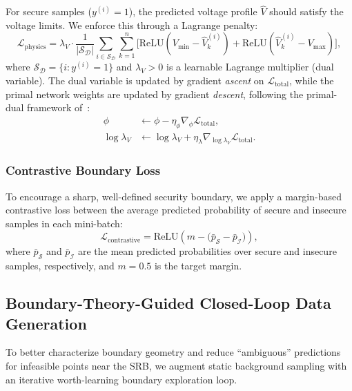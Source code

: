 \documentclass[journal]{IEEEtran}
\newcommand{\SSR}{\mathcal{S}}
\newcommand{\Loss}{\mathcal{L}}
\newcommand{\relu}{\mathrm{ReLU}}
\begin{document}
For secure samples ($y^{(i)}=1$), the predicted voltage profile $\hat{V}$
should satisfy the voltage limits. We enforce this through a Lagrange penalty:
\begin{equation}
  \Loss_{\mathrm{physics}} = \lambda_V \cdot
    \frac{1}{|\SSR_\mathcal{D}|} \sum_{i \in \SSR_\mathcal{D}}
    \sum_{k=1}^{n} \bigl[\relu(V_{\min} - \hat{V}_k^{(i)})
      + \relu(\hat{V}_k^{(i)} - V_{\max})\bigr],
  \label{eq:physics_loss}
\end{equation}
where $\SSR_\mathcal{D} = \{i : y^{(i)} = 1\}$ and $\lambda_V > 0$ is a learnable
Lagrange multiplier (dual variable). The dual variable is updated by gradient
\emph{ascent} on $\Loss_{\mathrm{total}}$, while the primal network weights are
updated by gradient \emph{descent}, following the primal-dual framework
of~\cite{kim2025deeplagrange}:
\begin{align}
  \phi &\leftarrow \phi - \eta_\phi \nabla_\phi \Loss_{\mathrm{total}},
    \label{eq:primal_update}\\
  \log\lambda_V &\leftarrow \log\lambda_V + \eta_\lambda
    \nabla_{\log\lambda_V} \Loss_{\mathrm{total}}.
    \label{eq:dual_update}
\end{align}

\subsubsection{Contrastive Boundary Loss}

To encourage a sharp, well-defined security boundary, we apply a margin-based
contrastive loss between the average predicted probability of secure and
insecure samples in each mini-batch:
\begin{equation}
  \Loss_{\mathrm{contrastive}} = \relu\!\left(
    m - \bigl(\bar{p}_{\SSR} - \bar{p}_{\mathcal{I}}\bigr)
  \right),
  \label{eq:contrastive}
\end{equation}
where $\bar{p}_{\SSR}$ and $\bar{p}_{\mathcal{I}}$ are the mean
predicted probabilities over secure and insecure samples, respectively, and
$m = 0.5$ is the target margin.

\subsection{Boundary-Theory-Guided Closed-Loop Data Generation}
\label{subsec:boundary_loop}

To better characterize boundary geometry and reduce ``ambiguous'' predictions
for infeasible points near the SRB, we augment static background sampling with
an iterative worth-learning boundary exploration loop.
\end{document}
